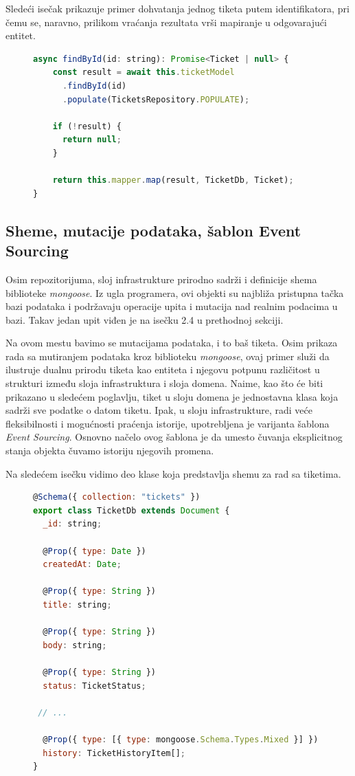 \documentclass[12pt,oneside]{memoir}
\begin{document}
\newpage
Sledeći isečak prikazuje primer dohvatanja jednog tiketa putem identifikatora, pri čemu se, naravno, prilikom vraćanja rezultata vrši mapiranje u odgovarajući entitet.

\begin{figure}[h]
\begin{lstlisting}[language=JavaScript, style=ES6, caption={Fajl \textit{tickets.repository.ts}, dohvatanje entiteta}]
async findById(id: string): Promise<Ticket | null> {
    const result = await this.ticketModel
      .findById(id)
      .populate(TicketsRepository.POPULATE);
    
    if (!result) {
      return null;
    }
    
    return this.mapper.map(result, TicketDb, Ticket);
}
\end{lstlisting}
\end{figure}

\newpage
\subsection{Sheme, mutacije podataka, šablon Event Sourcing}
\label{sec:eventsourcing}
Osim repozitorijuma, sloj infrastrukture prirodno sadrži i definicije shema biblioteke \textit{mongoose}. Iz ugla programera, ovi objekti su najbliža pristupna tačka bazi podataka i podržavaju operacije upita i mutacija nad realnim podacima u bazi. Takav jedan upit viđen je na isečku 2.4 u prethodnoj sekciji.

Na ovom mestu bavimo se mutacijama podataka, i to baš tiketa. Osim prikaza rada sa mutiranjem podataka kroz biblioteku \textit{mongoose}, ovaj primer služi da ilustruje dualnu prirodu tiketa kao entiteta i njegovu potpunu različitost u strukturi između sloja infrastruktura i sloja domena. Naime, kao što će biti prikazano u sledećem poglavlju, tiket u sloju domena je jednostavna klasa koja sadrži sve podatke o datom tiketu. Ipak, u sloju infrastrukture, radi veće fleksibilnosti i mogućnosti praćenja istorije, upotrebljena je varijanta šablona \textit{Event Sourcing}. Osnovno načelo ovog šablona je da umesto čuvanja eksplicitnog stanja objekta čuvamo istoriju njegovih promena.

Na sledećem isečku vidimo deo klase koja predstavlja shemu za rad sa tiketima.

\begin{figure}[h]
\begin{lstlisting}[language=JavaScript, style=ES6, caption={Fajl \textit{ticket.schema.ts}}]
@Schema({ collection: "tickets" })
export class TicketDb extends Document {
  _id: string;

  @Prop({ type: Date })
  createdAt: Date;

  @Prop({ type: String })
  title: string;

  @Prop({ type: String })
  body: string;

  @Prop({ type: String })
  status: TicketStatus;

 // ...

  @Prop({ type: [{ type: mongoose.Schema.Types.Mixed }] })
  history: TicketHistoryItem[];
}
\end{lstlisting}
\end{figure}
\end{document}
